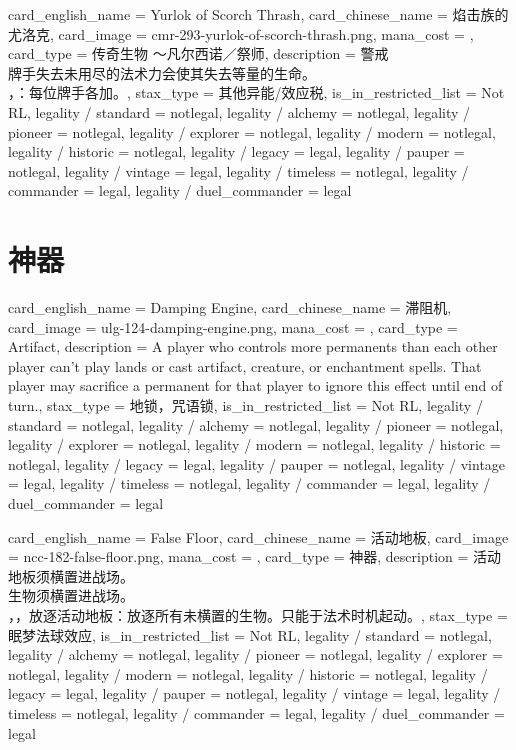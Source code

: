 \documentclass[lang = cn, color = black, 10pt]{AllThatStax}
\begin{document}
\card
{
	card_english_name = {Yurlok of Scorch Thrash},
	card_chinese_name = {焰击族的尤洛克},
	card_image = cmr-293-yurlok-of-scorch-thrash.png,
	mana_cost = ,
	card_type = 传奇生物 ～凡尔西诺／祭师,
	description = {警戒\\
		牌手失去未用尽的法术力会使其失去等量的生命。\\
		，：每位牌手各加。},
	stax_type = 其他异能/效应税,
	is_in_restricted_list = Not RL,
	legality / standard = notlegal,
	legality / alchemy = notlegal,
	legality / pioneer = notlegal,
	legality / explorer = notlegal,
	legality / modern = notlegal,
	legality / historic = notlegal,
	legality / legacy = legal,
	legality / pauper = notlegal,
	legality / vintage = legal,
	legality / timeless = notlegal,
	legality / commander = legal,
	legality / duel_commander = legal
}

\section{神器}

\card
{
	card_english_name = {Damping Engine},
	card_chinese_name = {滞阻机},
	card_image = ulg-124-damping-engine.png,
	mana_cost = ,
	card_type = Artifact,
	description = {A player who controls more permanents than each other player can't play lands or cast artifact, creature, or enchantment spells. That player may sacrifice a permanent for that player to ignore this effect until end of turn.},
	stax_type = 地锁，咒语锁,
	is_in_restricted_list = Not RL,
	legality / standard = notlegal,
	legality / alchemy = notlegal,
	legality / pioneer = notlegal,
	legality / explorer = notlegal,
	legality / modern = notlegal,
	legality / historic = notlegal,
	legality / legacy = legal,
	legality / pauper = notlegal,
	legality / vintage = legal,
	legality / timeless = notlegal,
	legality / commander = legal,
	legality / duel_commander = legal
}

\card
{
	card_english_name = {False Floor},
	card_chinese_name = {活动地板},
	card_image = ncc-182-false-floor.png,
	mana_cost = ,
	card_type = 神器,
	description = {活动地板须横置进战场。\\
		生物须横置进战场。\\
		，，放逐活动地板：放逐所有未横置的生物。只能于法术时机起动。},
	stax_type = 眠梦法球效应,
	is_in_restricted_list = Not RL,
	legality / standard = notlegal,
	legality / alchemy = notlegal,
	legality / pioneer = notlegal,
	legality / explorer = notlegal,
	legality / modern = notlegal,
	legality / historic = notlegal,
	legality / legacy = legal,
	legality / pauper = notlegal,
	legality / vintage = legal,
	legality / timeless = notlegal,
	legality / commander = legal,
	legality / duel_commander = legal
}
\end{document}
